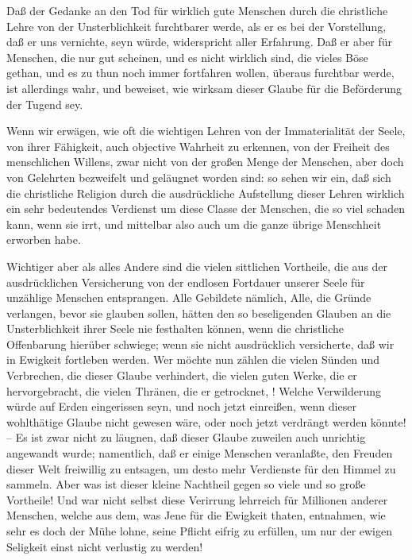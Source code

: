 \begin{aufza}
\item Daß der Gedanke an den Tod für wirklich gute Menschen durch die christliche Lehre von der Unsterblichkeit furchtbarer werde, als er es bei der Vorstellung, daß er uns vernichte, seyn würde, widerspricht aller Erfahrung. Daß er aber für Menschen, die nur gut scheinen, und es nicht wirklich sind, die vieles Böse gethan, und es zu thun noch immer fortfahren wollen, überaus furchtbar werde, ist allerdings wahr, und beweiset, wie wirksam dieser Glaube für die Beförderung der Tugend sey.
\end{aufza}

Wenn wir erwägen, wie oft die wichtigen Lehren von der Immaterialität der Seele, von ihrer Fähigkeit, auch objective Wahrheit zu erkennen, von der Freiheit des menschlichen Willens, zwar nicht von der großen Menge der Menschen, aber doch von Gelehrten bezweifelt und geläugnet worden sind: so sehen wir ein, daß sich die christliche Religion durch die ausdrückliche Aufstellung dieser Lehren wirklich ein sehr bedeutendes Verdienst um diese Classe der Menschen, die so viel schaden kann, wenn sie irrt, und mittelbar also auch um die ganze übrige Menschheit erworben habe.\par
Wichtiger aber als alles Andere sind die vielen sittlichen Vortheile, die aus der ausdrücklichen Versicherung von der endlosen Fortdauer unserer Seele für unzählige Menschen entsprangen. Alle Gebildete nämlich, Alle, die Gründe verlangen, bevor sie glauben sollen, hätten den so beseligenden Glauben an die Unsterblichkeit ihrer Seele nie festhalten können, wenn die christliche Offenbarung hierüber schwiege; wenn sie nicht ausdrücklich versicherte, daß wir in Ewigkeit fortleben werden. Wer möchte nun zählen die vielen Sünden und Verbrechen, die dieser Glaube verhindert, die vielen guten Werke, die er hervorgebracht, die vielen Thränen, die er getrocknet, \usw ! Welche Verwilderung würde auf Erden eingerissen seyn, und noch jetzt einreißen, wenn dieser wohlthätige Glaube nicht gewesen wäre, oder noch jetzt verdrängt werden könnte! -- Es ist zwar nicht zu läugnen, daß dieser Glaube zuweilen auch unrichtig angewandt wurde; namentlich, daß er einige Menschen veranlaßte, den Freuden dieser Welt freiwillig zu entsagen, um desto mehr Verdienste für den Himmel zu sammeln. Aber was ist dieser kleine Nachtheil gegen so viele und so große Vortheile! Und war nicht selbst diese Verirrung lehrreich für Millionen anderer Menschen, welche aus dem, was Jene für die Ewigkeit thaten, entnahmen, wie sehr es doch der Mühe lohne, seine Pflicht eifrig zu erfüllen, um nur der ewigen Seligkeit einst nicht verlustig zu werden!


